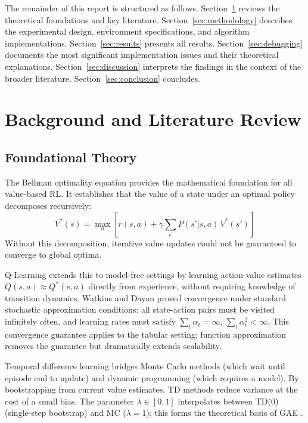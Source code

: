 \documentclass[a4paper,12pt]{article}
\begin{document}
The remainder of this report is structured as follows. Section~\ref{sec:background} reviews the theoretical foundations and key literature. Section~\ref{sec:methodology} describes the experimental design, environment specifications, and algorithm implementations. Section~\ref{sec:results} presents all results. Section~\ref{sec:debugging} documents the most significant implementation issues and their theoretical explanations. Section~\ref{sec:discussion} interprets the findings in the context of the broader literature. Section~\ref{sec:conclusion} concludes.

\section{Background and Literature Review}
\label{sec:background}

\subsection{Foundational Theory}

The Bellman optimality equation \cite{bellman1957dynamic} provides the mathematical foundation for all value-based RL. It establishes that the value of a state under an optimal policy decomposes recursively:
\begin{equation}
  V^*(s) = \max_a \left[ r(s,a) + \gamma \sum_{s'} P(s'|s,a)\, V^*(s') \right]
\end{equation}
Without this decomposition, iterative value updates could not be guaranteed to converge to global optima.

Q-Learning \cite{watkins1992q} extends this to model-free settings by learning action-value estimates $Q(s,a) \approx Q^*(s,a)$ directly from experience, without requiring knowledge of transition dynamics. Watkins and Dayan proved convergence under standard stochastic approximation conditions: all state-action pairs must be visited infinitely often, and learning rates must satisfy $\sum_t \alpha_t = \infty$, $\sum_t \alpha_t^2 < \infty$. This convergence guarantee applies to the tabular setting; function approximation removes the guarantee but dramatically extends scalability.

Temporal difference learning \cite{sutton1988learning} bridges Monte Carlo methods (which wait until episode end to update) and dynamic programming (which requires a model). By bootstrapping from current value estimates, TD methods reduce variance at the cost of a small bias. The parameter $\lambda \in [0,1]$ interpolates between TD(0) (single-step bootstrap) and MC ($\lambda=1$); this forms the theoretical basis of GAE \cite{schulman2015high}.
\end{document}
